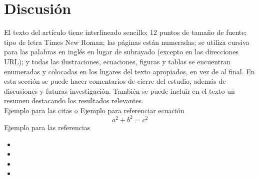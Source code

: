 \section{Discusión}
\label{sec:5}
El texto del artículo tiene interlineado sencillo; 12 puntos de tamaño de fuente; tipo de letra Times New Roman; las páginas están numeradas; se utiliza cursiva para las palabras en inglés en lugar de subrayado (excepto en las direcciones URL); y todas las ilustraciones, ecuaciones, figuras y tablas se encuentran enumeradas y colocadas en los lugares del texto apropiados, en vez de al final.
En esta sección se puede hacer comentarios de cierre del estudio, además de discusiones y futuras investigación. También se puede incluir en el texto un resumen destacando los resultados relevantes.
\\
Ejemplo para las citas \cite{einstein} o \cite{knuthwebsite,latexcompanion}
Ejemplo para referenciar ecuación 
\begin{equation}
    \label{ecuacion:circulo}
    a^2 + b^2 = c^2
\end{equation}
Ejemplo para las referencias 
\begin{itemize}
    \item {}
    \item {}
    \item {}
    \item {}
\end{itemize}